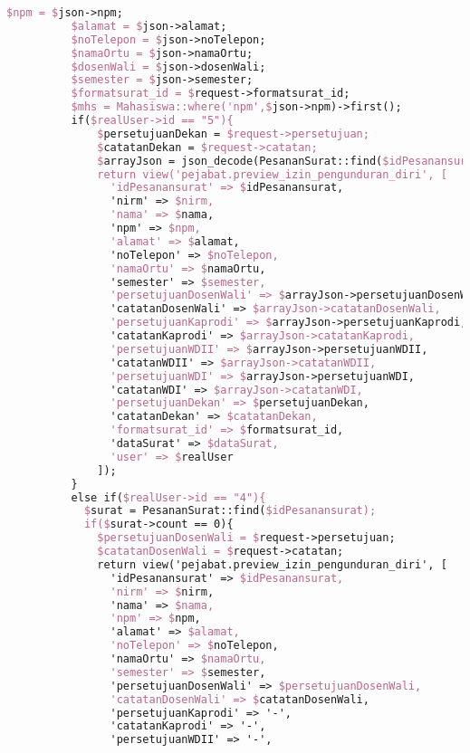 \begin{lstlisting}[language=tex,basicstyle=\tiny,caption=PesanansuratController.php]
          $npm = $json->npm;
          $alamat = $json->alamat;
          $noTelepon = $json->noTelepon;
          $namaOrtu = $json->namaOrtu;
          $dosenWali = $json->dosenWali;
          $semester = $json->semester;
          $formatsurat_id = $request->formatsurat_id;
          $mhs = Mahasiswa::where('npm',$json->npm)->first();
          if($realUser->id == "5"){
              $persetujuanDekan = $request->persetujuan;
              $catatanDekan = $request->catatan;
              $arrayJson = json_decode(PesananSurat::find($idPesanansurat)->dataSurat);
              return view('pejabat.preview_izin_pengunduran_diri', [
                'idPesanansurat' => $idPesanansurat,
                'nirm' => $nirm,
                'nama' => $nama,
                'npm' => $npm,
                'alamat' => $alamat,
                'noTelepon' => $noTelepon,
                'namaOrtu' => $namaOrtu,
                'semester' => $semester,
                'persetujuanDosenWali' => $arrayJson->persetujuanDosenWali,
                'catatanDosenWali' => $arrayJson->catatanDosenWali,
                'persetujuanKaprodi' => $arrayJson->persetujuanKaprodi,
                'catatanKaprodi' => $arrayJson->catatanKaprodi,
                'persetujuanWDII' => $arrayJson->persetujuanWDII,
                'catatanWDII' => $arrayJson->catatanWDII,
                'persetujuanWDI' => $arrayJson->persetujuanWDI,
                'catatanWDI' => $arrayJson->catatanWDI,
                'persetujuanDekan' => $persetujuanDekan,
                'catatanDekan' => $catatanDekan,
                'formatsurat_id' => $formatsurat_id,
                'dataSurat' => $dataSurat,
                'user' => $realUser
              ]);
          }
          else if($realUser->id == "4"){
            $surat = PesananSurat::find($idPesanansurat);
            if($surat->count == 0){
              $persetujuanDosenWali = $request->persetujuan;
              $catatanDosenWali = $request->catatan;
              return view('pejabat.preview_izin_pengunduran_diri', [
                'idPesanansurat' => $idPesanansurat,
                'nirm' => $nirm,
                'nama' => $nama,
                'npm' => $npm,
                'alamat' => $alamat,
                'noTelepon' => $noTelepon,
                'namaOrtu' => $namaOrtu,
                'semester' => $semester,
                'persetujuanDosenWali' => $persetujuanDosenWali,
                'catatanDosenWali' => $catatanDosenWali,
                'persetujuanKaprodi' => '-',
                'catatanKaprodi' => '-',
                'persetujuanWDII' => '-',

\end{lstlisting}
